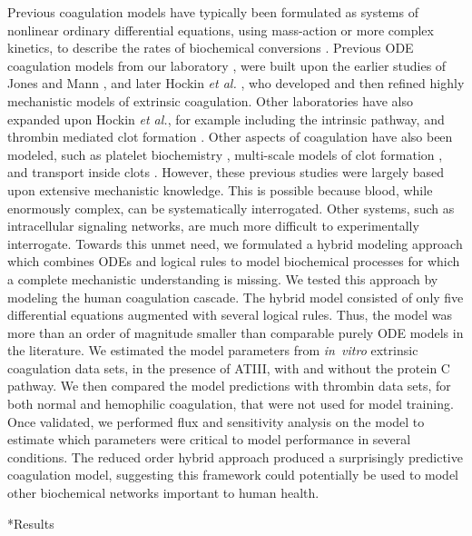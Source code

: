 \documentclass[12pt]{article}
\makeatletter
\renewcommand\section{\@startsection
	{subsection}{2}{0mm}
	{-0.2in}
	{0.05\baselineskip}
	{\normalfont\large\bfseries}}
\makeatother
\begin{document}
Previous coagulation models have typically been formulated as systems of nonlinear ordinary differential equations, 
using mass-action or more complex kinetics, to describe the rates of biochemical conversions \citep{Kuharsky:2001aa}.
Previous ODE coagulation models from our laboratory \citep{Luan:2007aa,2010_luan_varner_MolBioSys}, 
were built upon the earlier studies of Jones and Mann \citep{Jones:1994aa}, 
and later Hockin \emph{et al.} \citep{Hockin:2002aa}, who developed and then refined highly mechanistic models of extrinsic coagulation. 
Other laboratories have also expanded upon Hockin \emph{et al.}, for example including the intrinsic pathway, and thrombin mediated clot formation \citep{Chatterjee:2010aa}. 
Other aspects of coagulation have also been modeled, such as platelet biochemistry \citep{Stalker:2013aa}, 
multi-scale models of clot formation \citep{Leiderman:2014aa, Bannish:2014ab}, and transport inside clots \citep{Voronov:2013aa}.
However, these previous studies were largely based upon extensive mechanistic knowledge. 
This is possible because blood, while enormously complex, can be systematically interrogated.
Other systems, such as intracellular signaling networks, are much more difficult to experimentally interrogate.  
Towards this unmet need, we formulated a hybrid modeling approach which combines ODEs and logical rules to model 
biochemical processes for which a complete mechanistic understanding is missing. 
We tested this approach by modeling the human coagulation cascade. 
The hybrid model consisted of only five differential equations augmented with several logical rules.
Thus, the model was more than an order of magnitude smaller than comparable purely ODE models in the literature.
We estimated the model parameters from \textit{in~vitro} extrinsic coagulation data sets, in the presence of ATIII, with and without the protein C pathway. 
We then compared the model predictions with thrombin data sets, for both normal and hemophilic coagulation, that were not used for model training.
Once validated, we performed flux and sensitivity analysis on the model to estimate which parameters were critical to model performance in several conditions. 
The reduced order hybrid approach produced a surprisingly predictive coagulation model, 
suggesting this framework could potentially be used to model other biochemical networks important to human health. 

\clearpage

\section*{Results}
\end{document}
